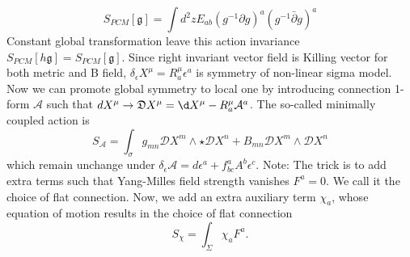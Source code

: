 \documentclass[a4paper]{article}
\begin{document}
\begin{equation}
S_{PCM} [\mathfrak{g}] = \int d^2z E_{a b} (g^{-1} \partial g)^a (g^{-1} \bar{\partial} g)^a 
\end{equation}
 Constant global transformation leave this action invariance $S_{PCM} [ h \mathfrak{g}] = S_{PCM} [\mathfrak{g}] $. Since right invariant vector field is Killing vector for both metric and B field,  $\delta_\epsilon X^{\mu} = R_{a}^{\mu}\epsilon^a$ is symmetry of non-linear sigma model. Now we can promote global symmetry to local one by introducing connection 1-form $\mathcal{A}$ such that $ d X^{\mu} \to \mathfrak{D} X^{\mu} = \d X^{\mu} - R^{\mu}_{a} \mathcal{A}^a$. The so-called minimally coupled action is
 \begin{equation}
S_{\mathcal{A}} =  \int_\sigma g_{m n} \mathcal{D} X^m \wedge \star \mathcal{D} X^n + B_{m n} \mathcal{D} X^m \wedge \mathcal{D} X^n 
 \end{equation}
 which remain unchange under $\delta_{\epsilon} \mathcal{A} = d \epsilon^a + f^{a}_{b c} A^{b} \epsilon^{c}$.
 Note: The trick is to add extra terms such that Yang-Milles field strength vanishes $F^{a} =0$. We call it the choice of flat connection.
 Now, we add an extra auxiliary term $\chi_a$, whose equation of motion results in the choice of flat connection
 \begin{equation}
 S_{\chi} = \int_\Sigma \chi_{a} F^a.
 \end{equation}
 
\end{document}
